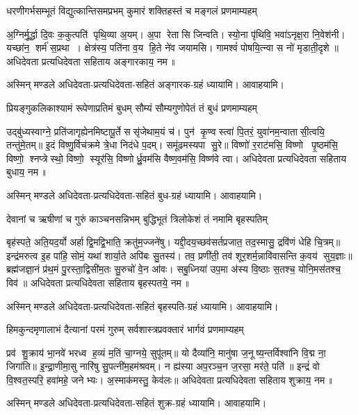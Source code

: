 \twolineshloka
{धरणीगर्भसम्भूतं विद्युत्कान्तिसमप्रभम्}
{कुमारं शक्तिहस्तं च मङ्गलं प्रणमाम्यहम्}

अ॒ग्निर्मू॒र्द्धा दि॒वः क॒कुत्पति॑ पृथि॒व्या अ॒यम्। अ॒पा रेतासि जिन्वति। स्यो॒ना पृ॑थिवि॒
भवा॑ऽनृक्ष॒रा नि॒वेश॑नी। यच्छा॑न॒ शर्म॑ स॒प्रथा। क्षेत्र॑स्य॒ पति॑ना व॒य हि॒ते ने॑व जयामसि।
गामश्वं॑ पोषयि॒त्न्वा स नो॑ मृडाती॒दृशे॥  अधिदेवता प्रत्यधिदेवता सहिताय अङ्गारकाय॒ नम॥ 

अस्मिन् मण्डले अधिदेवता-प्रत्यधिदेवता-सहितं अङ्गारक-ग्रहं ध्यायामि। आवाहयामि।


\twolineshloka
{प्रियङ्गुकलिकाश्यामं रूपेणाप्रतिमं बुधम्}
{सौम्यं सौम्यगुणोपेतं तं बुधं प्रणमाम्यहम्}

उद्बु॑ध्यस्वाग्ने॒ प्रति॑जागृह्येनमिष्टापू॒र्ते ससृ॑जेथाम॒यं च॑। पुन॑ कृ॒ण्वस्त्वा॑ पि॒तरं॒
युवा॑नम॒न्वातासी॒त्वयि॒ तन्तु॑मे॒तम्॥ इ॒दं विष्णु॒र्विच॑क्रमे त्रे॒धा निद॑धे प॒दम्। समू॑ढमस्यपा
सु॒रे॥ विष्णो॑ र॒राट॑मसि॒ विष्णो पृ॒ष्ठम॑सि॒ विष्णो॒ श्नप्त्रेस्थो॒ विष्णो॒ स्यूर॑सि॒
विष्णोर्ध्रु॒वम॑सि वैष्ण॒वम॑सि॒ विष्ण॑वे त्वा।  अधिदेवता प्रत्यधिदेवता सहिताय बुधाय॒ नम॥ 

अस्मिन् मण्डले अधिदेवता-प्रत्यधिदेवता-सहितं बुध-ग्रहं ध्यायामि। आवाहयामि।


\twolineshloka
{देवानां च ऋषीणां च गुरुं काञ्चनसन्निभम्}
{बुद्धिभूतं त्रिलोकेशं तं नमामि बृहस्पतिम्}

बृह॑स्पते॒ अति॒यद॒र्यो अर्हाद्वि॒मद्वि॒भाति॒ क्रतु॑म॒ज्जने॑षु। यद्दी॒दय॒च्छव॑सर्त\-प्रजात॒
तद॒स्मासु॒ द्रवि॑णं धेहि चि॒त्रम्॥ इन्द्र॑मरुत्व इ॒ह पा॑हि॒ सोमं॒ यथा॑ शार्या॒ते अपि॑बः सु॒तस्य॑।
तव॒ प्रणी॑ती॒ तव॑ शूर॒शर्म॒न्नावि॑वासन्ति क॒वय॑ सुय॒ज्ञाः॥ ब्रह्म॑जज्ञा॒नं प्र॑थ॒मं
पु॒रस्ता॒द्विसी॑म॒तः सु॒रुचो॑ वे॒न आ॑वः। सबु॒ध्निया॑ उप॒मा अ॑स्य वि॒ष्ठाः स॒तश्च॒ योनि॒मस॑तश्च॒
विव॑॥ अधिदेवता प्रत्यधिदेवता सहिताय बृहस्पतये॒ नम॥ 

अस्मिन् मण्डले अधिदेवता-प्रत्यधिदेवता-सहितं बृहस्पति-ग्रहं ध्यायामि। आवाहयामि।

\twolineshloka
{हिमकुन्दमृणालाभं दैत्यानां परमं गुरुम्}
{सर्वशास्त्रप्रवक्तारं भार्गवं प्रणमाम्यहम्}

प्रव॑ शु॒क्राय॑ भा॒नवे॑ भरध्व ह॒व्यं म॒तिं चा॒ग्नये॒ सुपू॑तम्॥ यो दैव्या॑नि॒ मानु॑षा
ज॒नूष्य॒न्तर्विश्वा॑नि वि॒द्म ना॒ जिगा॑ति॥ इ॒न्द्रा॒णीमा॒सु नारि॑षु सु॒पत्नी॑म॒हम॑श्रवम्। न
ह्य॑स्या अप॒रञ्च॒न ज॒रसा॒ मर॑ते॒ पति॑॥ इन्द्रं॑ वो वि॒श्वत॒स्परि॒ हवा॑महे॒ जनेभ्यः। अ॒स्माक॑मस्तु॒
केव॑लः॥  अधिदेवता प्रत्यधिदेवता सहिताय शुक्राय॒ नम॥ 

अस्मिन् मण्डले अधिदेवता-प्रत्यधिदेवता-सहितं शुक्र-ग्रहं ध्यायामि। आवाहयामि।


